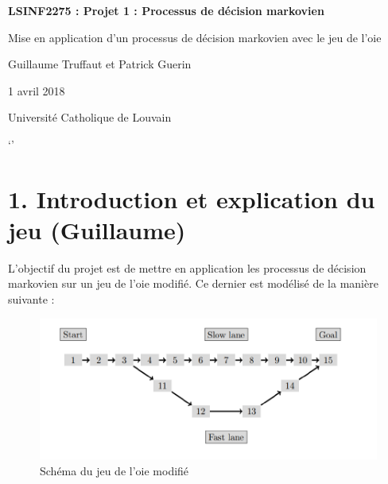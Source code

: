 \documentclass[french,]{article}
\title{}
\author{}
\date{}
\begin{document}
\begin{centering}

\vspace{6 cm}

\Huge

{\bf LSINF2275 : Projet 1 : Processus de décision markovien }

\vspace{1 cm}

\large


\vspace{2 cm}

\Large
Mise en application d'un processus de décision markovien avec le jeu de l'oie
\vspace{5 cm}


\Large
Guillaume Truffaut et Patrick Guerin


\vspace{5 cm}

\Large
1 avril 2018

\vspace{3 cm}



\normalsize
Université Catholique de Louvain

\vspace{3 cm}



\end{centering}

\graphicspath{ {(C:/Users/Guillaume/Documents/GitHub/markov-processes/} }

\newpage

`\tableofcontents'

\newpage

\usepackage[francais]{babel}

\section{1. Introduction et explication du jeu
(Guillaume)}\label{introduction-et-explication-du-jeu-guillaume}

L'objectif du projet est de mettre en application les processus de
décision markovien sur un jeu de l'oie modifié. Ce dernier est modélisé
de la manière suivante :

\begin{figure}[h]
\caption{Schéma du jeu de l'oie modifié}
\includegraphics{jeu de l'oie.PNG}
\centering
\end{figure}
\end{document}
